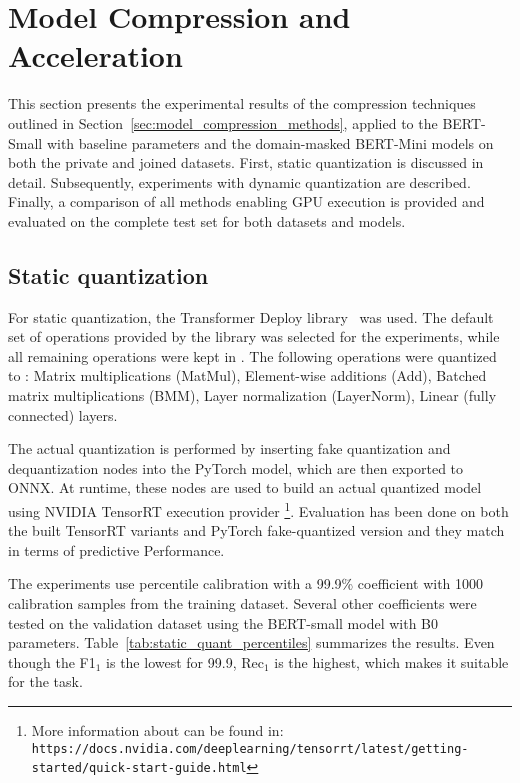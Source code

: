 \section{Model Compression and Acceleration}
This section presents the experimental results of the compression techniques outlined in Section~\ref{sec:model_compression_methods}, applied to the BERT-Small with baseline parameters and the domain-masked BERT-Mini models on both the private and joined datasets. First, static quantization is discussed in detail. Subsequently, experiments with dynamic quantization are described. Finally, a comparison of all methods enabling GPU execution is provided and evaluated on the complete test set for both datasets and models.

\subsection{Static quantization}
\label{sec:static_quant_experiments}

For static quantization, the Transformer Deploy library~\cite{els-rd_transformer-deploy_2025} was used. The default set of operations provided by the library was selected for the experiments, while all remaining operations were kept in . The following operations were quantized to : Matrix multiplications (MatMul), Element-wise additions (Add), Batched matrix multiplications (BMM), Layer normalization (LayerNorm), Linear (fully connected) layers.

The actual quantization is performed by inserting fake quantization and dequantization nodes into the PyTorch model, which are then exported to ONNX. At runtime, these nodes are used to build an actual quantized model using NVIDIA TensorRT execution provider \footnote{More information about can be found in: \nolinkurl{https://docs.nvidia.com/deeplearning/tensorrt/latest/getting-started/quick-start-guide.html}}. Evaluation has been done on both the built TensorRT variants and PyTorch fake-quantized version and they match in terms of predictive Performance.

The experiments use percentile calibration with a 99.9\% coefficient with 1000 calibration samples from the training dataset. Several other coefficients were tested on the validation dataset using the BERT-small model with B0 parameters. Table~\ref{tab:static_quant_percentiles} summarizes the results. Even though the F1$_1$ is the lowest for 99.9, Rec$_1$ is the highest, which makes it suitable for the task.

